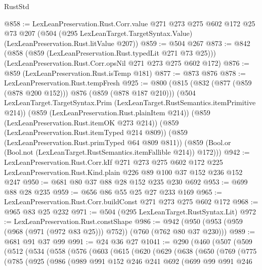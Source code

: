 \begin{lexlean}{RustStd}
\begin{coremodule}
{\begin{coremodule}
{{{{{@858 := LexLeanPreservation.Rust.Corr.value
    @271
    @273
    @275
    @602
    @172
    @25
    @73
    @207
    (@504 (@295 LexLeanTarget.TargetSyntax.Value) (LexLeanPreservation.Rust.litValue @207))
@859 := @504 @267
@873 := @842
    (@858 (@859 (LexLeanPreservation.Rust.typedLit @271 @73 @25)))
    (LexLeanPreservation.Rust.Corr.opsNil @271 @273 @275 @602 @172)
@876 := @859 (LexLeanPreservation.Rust.isTemp @181)
@877 := @873 @876
@878 := LexLeanPreservation.Rust.tempFresh
@925 := @800
    (@815
      (@832 (@877 (@859 (@878 @200 @152))) @876 (@859 (@878 @187 @210)))
      (@504 LexLeanTarget.TargetSyntax.Prim (LexLeanTarget.RustSemantics.itemPrimitive @214))
      (@859 (LexLeanPreservation.Rust.plainItem @214))
      (@859 (LexLeanPreservation.Rust.itemOK @273 @214))
      (@859 (LexLeanPreservation.Rust.itemTyped @214 @809))
      (@859 (LexLeanPreservation.Rust.primTyped @64 @809 @811))
      (@859 (Bool.or (Bool.not (LexLeanTarget.RustSemantics.itemFallible @214)) @172)))
@942 := LexLeanPreservation.Rust.Corr.kIf
    @271
    @273
    @275
    @602
    @172
    @225
    LexLeanPreservation.Rust.Kind.plain
    @226
    @89
    @100
    @37
    @152
    @236
    @152
    @247
@950 := @681 @80 @37 @88 @28 @152 @235 @230 @692
@953 := @699 @88 @28 @235
@959 := @656 @86 @55 @25 @27 @233 @169
@965 := LexLeanPreservation.Rust.Corr.buildConst @271 @273 @275 @602 @172
@968 := @965 @83 @25 @232
@971 := @504 (@295 LexLeanTarget.RustSyntax.Lit)
@972 := LexLeanPreservation.Rust.constShape
@986 := @942 (@950 (@953 (@959 (@968 (@971 (@972 @83 @25))) @752)) (@760 (@762 @80 @37 @230)))
@989 := @681 @91 @37 @99
@991 := @24 @36 @27
@1041 := @290
    (@460
      (@507
        (@509
          (@512
            (@534
              (@558
                (@576
                  (@603
                    (@615
                      (@620
                        (@629
                          (@638
                            (@650
                              (@769
                                (@775
                                  (@785
                                    (@925
                                      (@986
                                        (@989
                                          @991
                                          @152
                                          @246
                                          @241
                                          @692
                                          (@699
                                            @99
                                            @991
                                            @246
}}}}}
\end{coremodule}}
\end{coremodule}
\end{lexlean}
